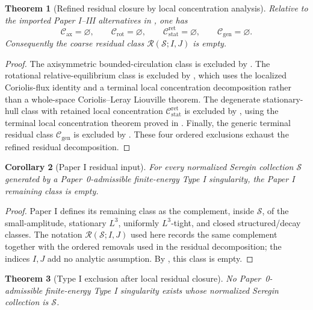 \documentclass[11pt]{amsart}
\numberwithin{equation}{section}
\theoremstyle{plain}
\newtheorem{theorem}{Theorem}[section]
\newtheorem{corollary}[theorem]{Corollary}
\theoremstyle{definition}
\theoremstyle{remark}
\newcommand{\calS}{\mathcal S}
\newcommand{\calR}{\mathcal R}
\newcommand{\Cax}{\mathcal C_{\mathrm{ax}}}
\newcommand{\Crot}{\mathcal C_{\mathrm{rot}}}
\newcommand{\Cstat}{\mathcal C_{\mathrm{stat}}^{\mathrm{ret}}}
\newcommand{\Cgen}{\mathcal C_{\mathrm{gen}}}
\begin{document}
\begin{theorem}[Refined residual closure by local concentration analysis]
\label{thm:refined-residual-closure}
Relative to the imported Paper I--III alternatives in
, one has
\[
   \Cax=\varnothing,\qquad
   \Crot=\varnothing,\qquad
   \Cstat=\varnothing,\qquad
   \Cgen=\varnothing .
\]
Consequently the coarse residual class \(\calR(\calS;I,J)\) is empty.
\end{theorem}

\begin{proof}
The axisymmetric bounded-circulation class is excluded by
.  The rotational relative-equilibrium class is excluded by
, which uses the localized Coriolis-flux identity
and a terminal local concentration decomposition rather than a whole-space
Coriolis--Leray Liouville theorem.
The degenerate stationary-hull class with retained local concentration
\(\Cstat\) is excluded by , using the
terminal local concentration theorem proved in
.
Finally, the generic terminal residual class \(\Cgen\) is excluded by
.  These four ordered exclusions exhaust the
refined residual decomposition.
\end{proof}

\begin{corollary}[Paper I residual input]
\label{cor:paperI-residual-input}
For every normalized Seregin collection \(\calS\) generated by a
Paper~0-admissible finite-energy Type I singularity, the Paper I remaining
class is empty.
\end{corollary}

\begin{proof}
Paper I defines its remaining class as the complement, inside \(\calS\), of
the small-amplitude, stationary \(L^3\), uniformly \(L^3\)-tight, and closed
structured/decay classes.  The notation \(\calR(\calS;I,J)\) used here records
the same complement together with the ordered removals used in the residual
decomposition; the indices \(I,J\) add no analytic assumption.  By
, this class is empty.
\end{proof}

\begin{theorem}[Type I exclusion after local residual closure]
\label{thm:typeI-exclusion-main}
No Paper~0-admissible finite-energy Type I singularity exists whose normalized
Seregin collection is \(\calS\).
\end{theorem}
\end{document}
